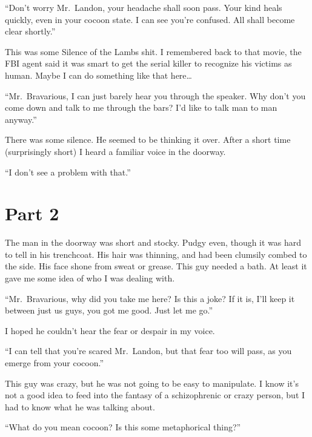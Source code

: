 ``Don't worry Mr.\ Landon, your headache shall soon pass.
Your kind heals quickly, even in your cocoon state. I can see
you're confused. All shall become clear shortly.''



This was some Silence of the Lambs shit. I remembered back to that
movie, the FBI agent said it was smart to get the serial killer to
recognize his victims as human. Maybe I can do something like that
here{\ldots}



``Mr.\ Bravarious, I can just barely hear you through the speaker.
Why don't you come down and talk to me through the bars?
I'd like to talk man to man anyway.''



There was some silence. He seemed to be thinking it over. After a
short time (surprisingly short) I heard a familiar voice in the
doorway.



``I don't see a problem with that.'' 

\section*{Part 2} 

The man in the doorway was short and stocky. Pudgy even, though it
was hard to tell in his trenchcoat. His hair was thinning, and had
been clumsily combed to the side. His face shone from sweat or
grease. This guy needed a bath. At least it gave me some idea of
who I was dealing with.



``Mr.\ Bravarious, why did you take me here? Is this a joke? If
it is, I'll keep it between just us guys, you got me good.
Just let me go.''



I hoped he couldn't hear the fear or despair in my
voice.



``I can tell that you're scared Mr.\ Landon, but that
fear too will pass, as you emerge from your cocoon.''



This guy was crazy, but he was not going to be easy to manipulate.
I know it's not a good idea to feed into the fantasy of a
schizophrenic or crazy person, but I had to know what he was
talking about.



``What do you mean cocoon? Is this some metaphorical
thing?''



